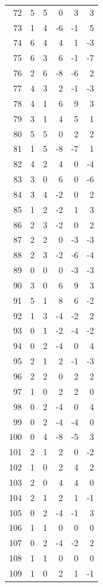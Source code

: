 \documentclass[11pt]{article}
\begin{document}
\begin{center}
\begin{longtable}{r r r r r r}
72 & 5 & 5 & 0 & 3 & 3\\
73 & 1 & 4 & -6 & -1 & 5\\
74 & 6 & 4 & 4 & 1 & -3\\
75 & 6 & 3 & 6 & -1 & -7\\
76 & 2 & 6 & -8 & -6 & 2\\
77 & 4 & 3 & 2 & -1 & -3\\
78 & 4 & 1 & 6 & 9 & 3\\
79 & 3 & 1 & 4 & 5 & 1\\
80 & 5 & 5 & 0 & 2 & 2\\
81 & 1 & 5 & -8 & -7 & 1\\
82 & 4 & 2 & 4 & 0 & -4\\
83 & 3 & 0 & 6 & 0 & -6\\
84 & 3 & 4 & -2 & 0 & 2\\
85 & 1 & 2 & -2 & 1 & 3\\
86 & 2 & 3 & -2 & 0 & 2\\
87 & 2 & 2 & 0 & -3 & -3\\
88 & 2 & 3 & -2 & -6 & -4\\
89 & 0 & 0 & 0 & -3 & -3\\
90 & 3 & 0 & 6 & 9 & 3\\
91 & 5 & 1 & 8 & 6 & -2\\
92 & 1 & 3 & -4 & -2 & 2\\
93 & 0 & 1 & -2 & -4 & -2\\
94 & 0 & 2 & -4 & 0 & 4\\
95 & 2 & 1 & 2 & -1 & -3\\
96 & 2 & 2 & 0 & 2 & 2\\
97 & 1 & 0 & 2 & 2 & 0\\
98 & 0 & 2 & -4 & 0 & 4\\
99 & 0 & 2 & -4 & -4 & 0\\
100 & 0 & 4 & -8 & -5 & 3\\
101 & 2 & 1 & 2 & 0 & -2\\
102 & 1 & 0 & 2 & 4 & 2\\
103 & 2 & 0 & 4 & 4 & 0\\
104 & 2 & 1 & 2 & 1 & -1\\
105 & 0 & 2 & -4 & -1 & 3\\
106 & 1 & 1 & 0 & 0 & 0\\
107 & 0 & 2 & -4 & -2 & 2\\
108 & 1 & 1 & 0 & 0 & 0\\
109 & 1 & 0 & 2 & 1 & -1\\
\bottomrule\end{longtable}
\end{center}
\end{document}
